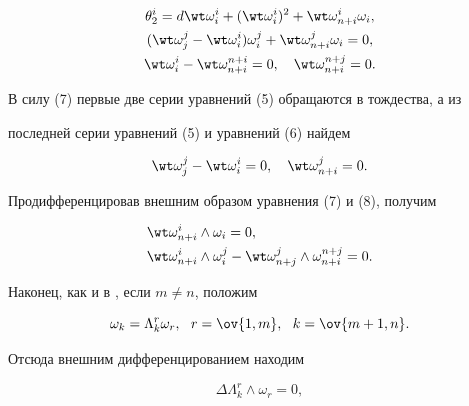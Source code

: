 \begin{gather} 


\theta^i_2=d\wt\omega^i_i+(\wt\omega^i_i)^2+ 


\wt\omega^i_{n+i}\omega_i,\notag \\ 


(\wt\omega^j_j-\wt\omega^i_i)\omega^j_i+\wt 


\omega^j_{n+i}\omega_i=0,\\ 


\wt\omega^i_i-\wt\omega^{n+i}_{n+i}=0,\quad 


\wt\omega^{n+j}_{n+i}=0. 


\end{gather} 


 


В силу (7) первые две серии уравнений (5) обращаются в тождества, а из 


последней серии уравнений (5) и уравнений (6) найдем 


\begin{equation} 


\wt\omega^j_j-\wt\omega^i_i=0,\quad 


\wt\omega^j_{n+i}=0. 


\end{equation} 


Продифференцировав внешним образом уравнения (7) и (8), получим \tts{&=}


\begin{align} 


&\wt\omega^i_{n+i}\wedge\omega_i=0,\\ 


&\wt\omega^i_{n+i}\wedge\omega^j_i- 


\wt\omega^j_{n+j}\wedge\omega^{n+j}_{n+i}=0. 


\end{align} 


Наконец, как и в \cite{2}, если $m\ne n$, положим 


\begin{equation} 


\omega_k=\Lambda^r_k\omega_r,\ \ r=\ov{1,m},\ \ k=\ov{m+1,n}. 


\end{equation} 


Отсюда внешним дифференцированием находим 


\begin{equation} 


\Delta\Lambda^r_k\wedge\omega_r=0, 


\end{equation} 


